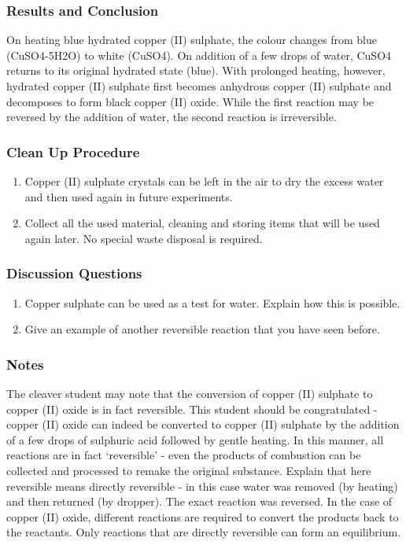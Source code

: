 \subsubsection*{Results and Conclusion}
On heating blue hydrated copper (II) sulphate, the colour changes from blue (CuSO4-5H2O) to white (CuSO4). On addition of a few drops of water, CuSO4 returns to its original hydrated state (blue). With prolonged heating, however, hydrated copper (II) sulphate first becomes anhydrous copper (II) sulphate and decomposes to form black copper (II) oxide. While the first reaction may be reversed by the addition of water, the second reaction is irreversible.

\subsubsection*{Clean Up Procedure}
\begin{enumerate}
\item{Copper (II) sulphate crystals can be left in the air to dry the excess water and then used again in future experiments.}
\item{Collect all the used material, cleaning and storing items that will be used again later. No special waste disposal is required.}
\end{enumerate}

\subsubsection*{Discussion Questions}
\begin{enumerate}
\item{Copper sulphate can be used as a test for water. Explain how this is possible.}
\item{Give an example of another reversible reaction that you have seen before.}
\end{enumerate}

\subsubsection*{Notes}
The cleaver student may note that the conversion of copper (II) sulphate to copper (II) oxide is in fact reversible. This student should be congratulated - copper (II) oxide can indeed be converted to copper (II) sulphate by the addition of a few drops of sulphuric acid followed by gentle heating. In this manner, all reactions are in fact `reversible' - even the products of combustion can be collected and processed to remake the original substance. Explain that here reversible means directly reversible - in this case water was removed (by heating) and then returned (by dropper). The exact reaction was reversed. In the case of copper (II) oxide, different reactions are required to convert the products back to the reactants. Only reactions that are directly reversible can form an equilibrium.

